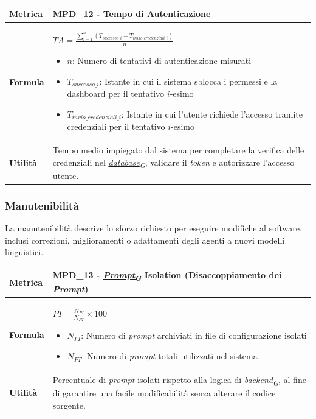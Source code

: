 \documentclass[12pt, a4paper]{article}
\newcommand{\urlglossario}{https://skynetunigroup.github.io/Code_Guardian/Documentazione/PB/glossario_v2.0.0.pdf} %
\newcommand{\glo}[2]{\href{\urlglossario\#nameddest=#2}{#1\textsubscript{G}}}
\begin{document}
\begin{table}[H]
\centering
\renewcommand{\arraystretch}{1.5}
\begin{tabular}{|l|p{12cm}|}
\hline
\textbf{Metrica} & MPD\_12 - Tempo di Autenticazione \\ \hline
\textbf{Formula} & $TA = \frac{\sum_{i=1}^{n} (T_{successo\_i} - T_{invio\_credenziali\_i})}{n}$
\begin{itemize}
    \item $n$: Numero di tentativi di autenticazione misurati
    \item $T_{successo\_i}$: Istante in cui il sistema sblocca i permessi e la dashboard per il tentativo $i$-esimo
    \item $T_{invio\_credenziali\_i}$: Istante in cui l'utente richiede l'accesso tramite credenziali per il tentativo $i$-esimo
\end{itemize} \\ \hline
\textbf{Utilità} & Tempo medio impiegato dal sistema per completare la verifica delle credenziali nel \textit{\glo{database}{database}}, validare il \textit{token} e autorizzare l'accesso utente. \\ \hline
\end{tabular}
\end{table}

\subsubsection{Manutenibilità}
La manutenibilità descrive lo sforzo richiesto per eseguire modifiche al software, inclusi correzioni, miglioramenti o adattamenti degli agenti a nuovi modelli linguistici.

\begin{table}[H]
\centering
\renewcommand{\arraystretch}{1.5}
\begin{tabular}{|l|p{12cm}|}
\hline
\textbf{Metrica} & MPD\_13 - \textit{\glo{Prompt}{prompt}} Isolation (Disaccoppiamento dei \textit{Prompt}) \\ \hline
\textbf{Formula} & $PI = \frac{N_{PI}}{N_{PT}} \times 100$
\begin{itemize}
    \item $N_{PI}$: Numero di \textit{prompt} archiviati in file di configurazione isolati
    \item $N_{PT}$: Numero di \textit{prompt} totali utilizzati nel sistema
\end{itemize} \\ \hline
\textbf{Utilità} & Percentuale di \textit{prompt} isolati rispetto alla logica di \textit{\glo{backend}{backend}}, al fine di garantire una facile modificabilità senza alterare il codice sorgente. \\ \hline
\end{tabular}
\end{table}
\end{document}
